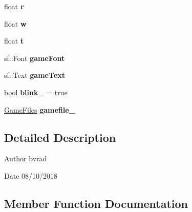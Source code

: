 \begin{DoxyCompactItemize}
\item 
\mbox{\label{class_splash_screen_a7c4400cf529a50573bd114fb00073e92}} 
float {\bfseries r}
\item 
\mbox{\label{class_splash_screen_ad7b085e2cbee7c5c8df8f339efc6fe6e}} 
float {\bfseries w}
\item 
\mbox{\label{class_splash_screen_a19cd9ea9c41709c7c448f6bd805301eb}} 
float {\bfseries t}
\item 
\mbox{\label{class_splash_screen_a96495c24bbd96b03df2ce250ac85c27d}} 
sf\+::\+Font {\bfseries game\+Font}
\item 
\mbox{\label{class_splash_screen_afdf82e128b52d4d84ea5a2918aab60e8}} 
sf\+::\+Text {\bfseries game\+Text}
\item 
\mbox{\label{class_splash_screen_a9bd638ad81224ec3881bc959589d03fb}} 
bool {\bfseries blink\+\_\+} = true
\item 
\mbox{\label{class_splash_screen_a4e0c6dd83de43428c0eb57e03a74cdb9}} 
\mbox{\hyperlink{class_game_files}{Game\+Files}} {\bfseries gamefile\+\_\+}
\end{DoxyCompactItemize}


\subsection{Detailed Description}
\begin{DoxyAuthor}{Author}
bvrad 
\end{DoxyAuthor}
\begin{DoxyDate}{Date}
08/10/2018 
\end{DoxyDate}


\subsection{Member Function Documentation}
\mbox{\label{class_splash_screen_aee2130b85a0f8850816f155cf8c4800b}} 
